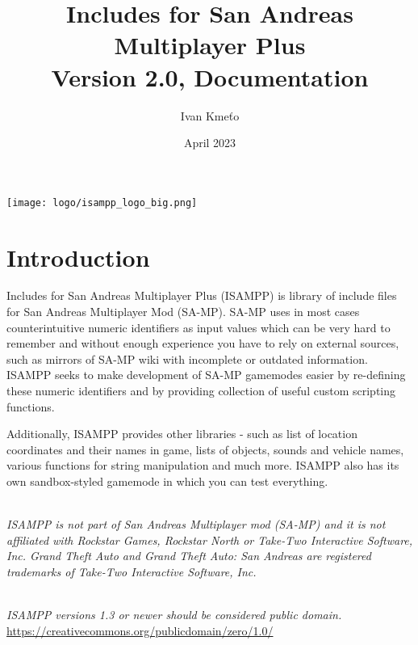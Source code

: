 \documentclass{article}
\title{Includes for San Andreas Multiplayer Plus\\Version 2.0, Documentation}
\author{Ivan Kmeťo}
\date{April 2023}
\begin{document}
\maketitle
\begin{center}
\texttt{[image: logo/isampp\_logo\_big.png]}
\end{center}


\newpage
\tableofcontents


\newpage
\section{Introduction}
Includes for San Andreas Multiplayer Plus (ISAMPP) is library of include files for San Andreas Multiplayer Mod (SA-MP). SA-MP uses in most cases counterintuitive numeric identifiers as input values which can be very hard to remember and without enough experience you have to rely on external sources, such as mirrors of SA-MP wiki with incomplete or outdated information. ISAMPP seeks to make development of SA-MP gamemodes easier by re-defining these numeric identifiers and by providing collection of useful custom scripting functions.

\bigskip
\noindent Additionally, ISAMPP provides other libraries - such as list of location coordinates and their names in game, lists of objects, sounds and vehicle names, various functions for string manipulation and much more. ISAMPP also has its own sandbox-styled gamemode in which you can test everything.

\textit{\\ISAMPP is not part of San Andreas Multiplayer mod (SA-MP) and it is not affiliated with Rockstar Games, Rockstar North or Take-Two Interactive Software, Inc. Grand Theft Auto and Grand Theft Auto: San Andreas are registered trademarks of Take-Two Interactive Software, Inc.}

\textit{\\ISAMPP versions 1.3 or newer should be considered public domain.}
\\\url{https://creativecommons.org/publicdomain/zero/1.0/}
\end{document}
